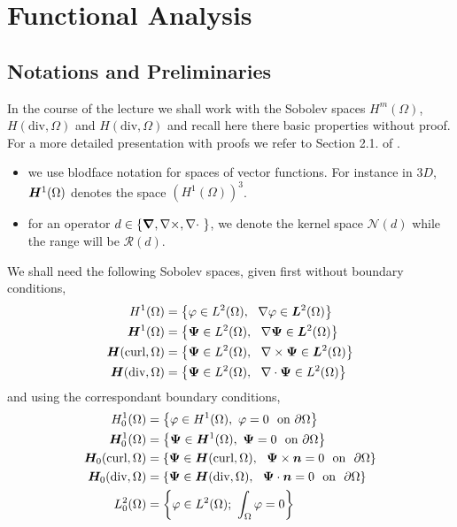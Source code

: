 \chapter{Functional Analysis}
\label{ch:fem-functional-analysis}
\section{Notations and Preliminaries}

In the course of the lecture we shall work with the Sobolev spaces $ H^m(\Omega)$, $H(\textrm{div}, \Omega)$ and $H(\textrm{div}, \Omega)$ and recall here there basic properties without proof. For a more detailed presentation with proofs we refer to Section 2.1. of \cite{BoffiBook2013}.
%
\begin{itemize}
	\item we use blodface notation for spaces of vector functions. For instance in $3D$, $\bm{H}^1(\Omega)$ denotes the space $\left( H^1(\Omega) \right)^3$. 
        \item for an operator $d \in \{\Grad, \Curl, \Div \}$, we denote the kernel space $\mathcal{N}(d)$ while the range will be $\mathcal{R}(d)$.
\end{itemize}
%
We shall need the following Sobolev spaces, given first without boundary conditions,
%
\begin{align}
    \Hgrad  &= \left\{ \varphi \in L^2(\Omega), ~ \nabla \varphi \in \Ltwov \right\} 
    \\
    \Hgradv &= \left\{ \PsiPsi \in L^2(\Omega), ~ \nabla \PsiPsi \in \Ltwov  \right\} 
    \\
    \Hcurl  &= \left\{ \PsiPsi \in L^2(\Omega), ~ \Curl \PsiPsi \in \Ltwov  \right\} 
    \\
    \Hdiv   &= \left\{ \PsiPsi \in L^2(\Omega), ~ \Div \PsiPsi \in \Ltwo  \right\} 
\end{align}
%
and using the correspondant boundary conditions,
%
\begin{align}
    \Hgradzero &= \left\{ \varphi \in \Hgrad, ~ \varphi = 0 ~ \mbox{on} ~ \partial \Omega \right\}
    \\
    \Hgradvzero &= \left\{ \PsiPsi \in \Hgradv, ~ \PsiPsi = 0 ~ \mbox{on} ~ \partial \Omega \right\}
    \\
    \Hcurlzero &= \left\{ \PsiPsi \in \Hcurl, ~ \PsiPsi \times \nn = 0 ~ \mbox{on} ~ \partial \Omega \right\} 
    \\
    \Hdivzero &= \left\{ \PsiPsi \in \Hdiv, ~ \PsiPsi \cdot \nn = 0 ~ \mbox{on} ~ \partial \Omega \right\} 
    \\
    \Ltwozero  &= \left\{ \varphi \in L^2(\Omega); ~ \int_{\Omega} \varphi = 0  \right\}
\end{align}
